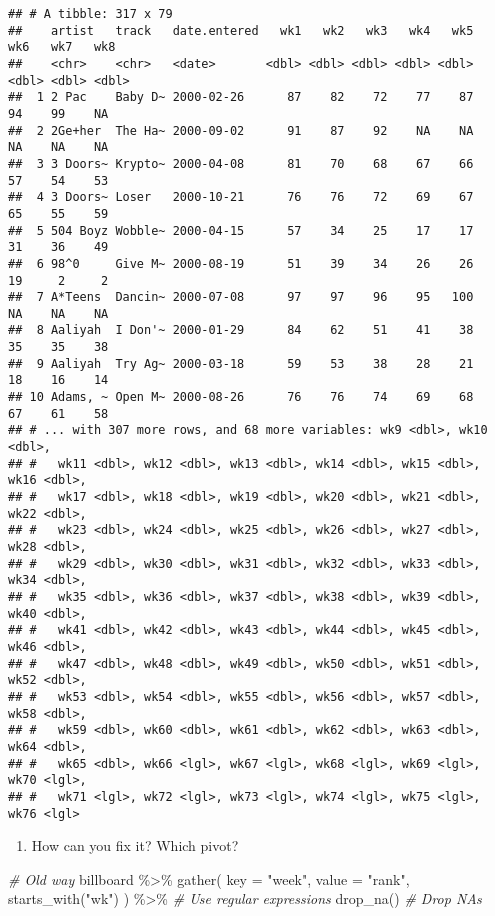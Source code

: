 \documentclass[
]{book}
\newenvironment{Shaded}{\begin{snugshade}}{\end{snugshade}}
\newcommand{\AttributeTok}[1]{\textcolor[rgb]{0.77,0.63,0.00}{#1}}
\newcommand{\CommentTok}[1]{\textcolor[rgb]{0.56,0.35,0.01}{\textit{#1}}}
\newcommand{\FunctionTok}[1]{\textcolor[rgb]{0.00,0.00,0.00}{#1}}
\newcommand{\NormalTok}[1]{#1}
\newcommand{\SpecialCharTok}[1]{\textcolor[rgb]{0.00,0.00,0.00}{#1}}
\newcommand{\StringTok}[1]{\textcolor[rgb]{0.31,0.60,0.02}{#1}}
\providecommand{\tightlist}{%
  \setlength{\itemsep}{0pt}\setlength{\parskip}{0pt}}
\begin{document}
\begin{verbatim}
## # A tibble: 317 x 79
##    artist   track   date.entered   wk1   wk2   wk3   wk4   wk5   wk6   wk7   wk8
##    <chr>    <chr>   <date>       <dbl> <dbl> <dbl> <dbl> <dbl> <dbl> <dbl> <dbl>
##  1 2 Pac    Baby D~ 2000-02-26      87    82    72    77    87    94    99    NA
##  2 2Ge+her  The Ha~ 2000-09-02      91    87    92    NA    NA    NA    NA    NA
##  3 3 Doors~ Krypto~ 2000-04-08      81    70    68    67    66    57    54    53
##  4 3 Doors~ Loser   2000-10-21      76    76    72    69    67    65    55    59
##  5 504 Boyz Wobble~ 2000-04-15      57    34    25    17    17    31    36    49
##  6 98^0     Give M~ 2000-08-19      51    39    34    26    26    19     2     2
##  7 A*Teens  Dancin~ 2000-07-08      97    97    96    95   100    NA    NA    NA
##  8 Aaliyah  I Don'~ 2000-01-29      84    62    51    41    38    35    35    38
##  9 Aaliyah  Try Ag~ 2000-03-18      59    53    38    28    21    18    16    14
## 10 Adams, ~ Open M~ 2000-08-26      76    76    74    69    68    67    61    58
## # ... with 307 more rows, and 68 more variables: wk9 <dbl>, wk10 <dbl>,
## #   wk11 <dbl>, wk12 <dbl>, wk13 <dbl>, wk14 <dbl>, wk15 <dbl>, wk16 <dbl>,
## #   wk17 <dbl>, wk18 <dbl>, wk19 <dbl>, wk20 <dbl>, wk21 <dbl>, wk22 <dbl>,
## #   wk23 <dbl>, wk24 <dbl>, wk25 <dbl>, wk26 <dbl>, wk27 <dbl>, wk28 <dbl>,
## #   wk29 <dbl>, wk30 <dbl>, wk31 <dbl>, wk32 <dbl>, wk33 <dbl>, wk34 <dbl>,
## #   wk35 <dbl>, wk36 <dbl>, wk37 <dbl>, wk38 <dbl>, wk39 <dbl>, wk40 <dbl>,
## #   wk41 <dbl>, wk42 <dbl>, wk43 <dbl>, wk44 <dbl>, wk45 <dbl>, wk46 <dbl>,
## #   wk47 <dbl>, wk48 <dbl>, wk49 <dbl>, wk50 <dbl>, wk51 <dbl>, wk52 <dbl>,
## #   wk53 <dbl>, wk54 <dbl>, wk55 <dbl>, wk56 <dbl>, wk57 <dbl>, wk58 <dbl>,
## #   wk59 <dbl>, wk60 <dbl>, wk61 <dbl>, wk62 <dbl>, wk63 <dbl>, wk64 <dbl>,
## #   wk65 <dbl>, wk66 <lgl>, wk67 <lgl>, wk68 <lgl>, wk69 <lgl>, wk70 <lgl>,
## #   wk71 <lgl>, wk72 <lgl>, wk73 <lgl>, wk74 <lgl>, wk75 <lgl>, wk76 <lgl>
\end{verbatim}

\begin{enumerate}
\def\labelenumi{\arabic{enumi}.}
\setcounter{enumi}{1}
\tightlist
\item
  How can you fix it? Which pivot?
\end{enumerate}

\begin{Shaded}
\begin{Highlighting}[]
\CommentTok{\# Old way}
\NormalTok{billboard }\SpecialCharTok{\%\textgreater{}\%}
  \FunctionTok{gather}\NormalTok{(}
    \AttributeTok{key =} \StringTok{"week"}\NormalTok{,}
    \AttributeTok{value =} \StringTok{"rank"}\NormalTok{,}
    \FunctionTok{starts\_with}\NormalTok{(}\StringTok{"wk"}\NormalTok{)}
\NormalTok{  ) }\SpecialCharTok{\%\textgreater{}\%} \CommentTok{\# Use regular expressions}
  \FunctionTok{drop\_na}\NormalTok{() }\CommentTok{\# Drop NAs}
\end{Highlighting}
\end{Shaded}
\end{document}
